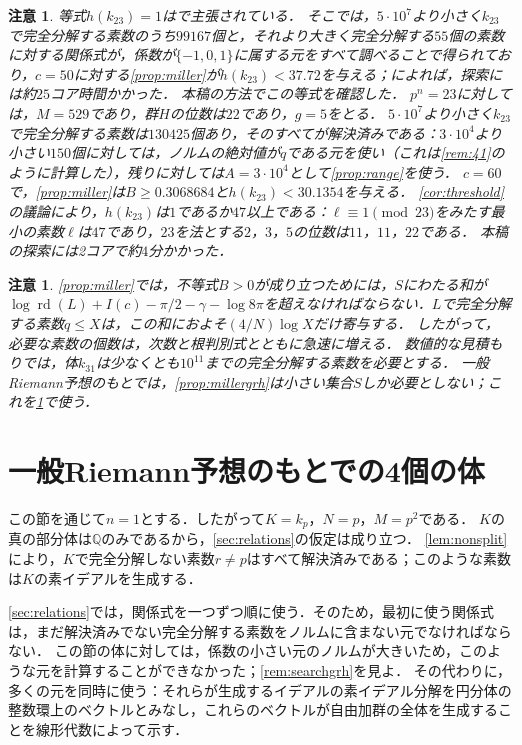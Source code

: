 \documentclass[11pt,a4paper]{ltjsarticle}
\theoremstyle{ja}
\newtheorem{remark}[theorem]{注意}
\begin{document}
\begin{remark} \label{rem:23}
等式$h(k_{23}) = 1$は\cite{Ch26}で主張されている．
そこでは，$5 \cdot 10^7$より小さく$k_{23}$で完全分解する素数のうち$99167$個と，それより大きく完全分解する$55$個の素数に対する関係式が，係数が$\{-1, 0, 1\}$に属する元をすべて調べることで得られており，$c = 50$に対する\cref{prop:miller}が$h(k_{23}) < 37.72$を与える；\cite{Ch26}によれば，探索には約$25$コア時間かかった．
本稿の方法でこの等式を確認した．
$p^n = 23$に対しては，$M = 529$であり，群$H$の位数は$22$であり，$g = 5$をとる．
$5 \cdot 10^7$より小さく$k_{23}$で完全分解する素数は$130425$個あり，そのすべてが解決済みである：$3 \cdot 10^4$より小さい$150$個に対しては，ノルムの絶対値が$q$である元を使い（これは\cref{rem:41}のように計算した），残りに対しては$A = 3 \cdot 10^4$として\cref{prop:range}を使う．
$c = 60$で，\cref{prop:miller}は$B \ge 0.3068684$と$h(k_{23}) < 30.1354$を与える．
\cref{cor:threshold}の議論により，$h(k_{23})$は$1$であるか$47$以上である：$\ell \equiv 1 \pmod{23}$をみたす最小の素数$\ell$は$47$であり，$23$を法とする$2$，$3$，$5$の位数は$11$，$11$，$22$である．
本稿の探索には2コアで約$4$分かかった．
\end{remark}

\begin{remark} \label{rem:limit}
\cref{prop:miller}では，不等式$B > 0$が成り立つためには，$S$にわたる和が$\log \operatorname{rd}(L) + I(c) - \pi/2 - \gamma - \log 8\pi$を超えなければならない．$L$で完全分解する素数$q \le X$は，この和におよそ$(4/N) \log X$だけ寄与する．
したがって，必要な素数の個数は，次数と根判別式とともに急速に増える．
数値的な見積もりでは，体$k_{31}$は少なくとも$10^{11}$までの完全分解する素数を必要とする．
一般Riemann予想のもとでは，\cref{prop:millergrh}は小さい集合$S$しか必要としない；これを\cref{sec:grh}で使う．
\end{remark}

\section{一般Riemann予想のもとでの4個の体} \label{sec:grh}

この節を通じて$n = 1$とする．したがって$K = k_p$，$N = p$，$M = p^2$である．
$K$の真の部分体は$\mathbb{Q}$のみであるから，\cref{sec:relations}の仮定は成り立つ．
\cref{lem:nonsplit}により，$K$で完全分解しない素数$r \ne p$はすべて解決済みである；このような素数は$K$の素イデアルを生成する．

\cref{sec:relations}では，関係式を一つずつ順に使う．そのため，最初に使う関係式は，まだ解決済みでない完全分解する素数をノルムに含まない元でなければならない．
この節の体に対しては，係数の小さい元のノルムが大きいため，このような元を計算することができなかった；\cref{rem:searchgrh}を見よ．
その代わりに，多くの元を同時に使う：それらが生成するイデアルの素イデアル分解を円分体の整数環上のベクトルとみなし，これらのベクトルが自由加群の全体を生成することを線形代数によって示す．
\end{document}
